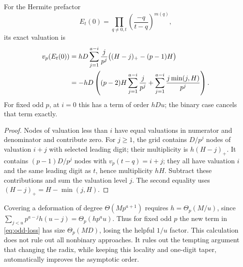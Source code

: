 \begin{proposition}\label{prop:oddprime}
For the Hermite prefactor
\[
 E_t(0)=\prod_{q\ne0,t}\left(\frac{-q}{t-q}\right)^{m(q)},
\]
its exact valuation is
\begin{align}
 v_p(E_t(0))
 &=hD\sum_{j=1}^{a-i}\frac{j}{p^j}
       \bigl((H-j)_+-(p-1)H\bigr)\notag\\
 &=-hD\left((p-2)H\sum_{j=1}^{a-i}\frac{j}{p^j}
       +\sum_{j=1}^{a-i}\frac{j\min(j,H)}{p^j}\right).
 \label{eq:odd-loss}
\end{align}
For fixed odd $p$, at $i=0$ this has a term of order $hDu$;
the binary case cancels that term exactly.
\end{proposition}
\begin{proof}
Nodes of valuation less than $i$ have equal valuations in numerator and
denominator and contribute zero. For $j\ge1$, the grid contains
$D/p^j$ nodes of valuation $i+j$ with selected leading digit; their
multiplicity is $h(H-j)_+$. It contains $(p-1)D/p^j$ nodes with
$v_p(t-q)=i+j$; they all have valuation $i$ and the same leading digit
as $t$, hence multiplicity $hH$. Subtract these contributions and sum
the valuation level $j$. The second equality uses
$(H-j)_+=H-\min(j,H)$.
\end{proof}

Covering a deformation of degree $\Theta(Mp^{a+1})$ requires
$h=\Theta_p(M/u)$, since
$\sum_{j<u}p^{a-j}h(u-j)=\Theta_p(hp^au)$.
Thus for fixed odd $p$ the new term in \eqref{eq:odd-loss} has size
$\Theta_p(MD)$, losing the helpful $1/u$ factor. This calculation
does not rule out all nonbinary approaches. It rules out the tempting
argument that changing the radix, while keeping this locality and
one-digit taper, automatically improves the asymptotic order.

